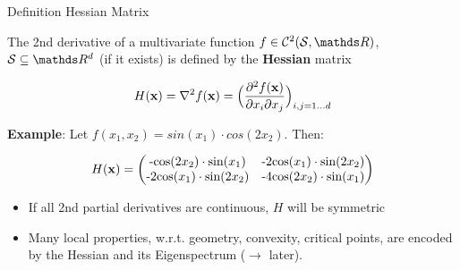 \documentclass[11pt,compress,t,notes=noshow, xcolor=table]{beamer}
\begin{document}
\begin{vbframe}{Definition Hessian Matrix}

The 2nd derivative of a multivariate function $f \in \mathcal{C}^2(\mathcal{S}, \R)$, $\mathcal{S}\subseteq \R^d$ (if it exists) is defined by the \textbf{Hessian} matrix

  \[ H(\mathbf{x}) =\nabla^2 f(\mathbf{x}) =
  \Bigl(\frac{\partial^2 f(\mathbf{x})}{\partial x_i \partial x_j}\Bigr)_{i,j=1\ldots d}\]
  
\lz 

\textbf{Example}: Let $f(x_1,x_2) = sin(x_1) \cdot cos(2x_2)$. Then:

$$
H(\mathbf{x}) = \begin{pmatrix}
\text{-cos}(2x_2)\cdot\text{sin}(x_1) & \text{-2cos}(x_1)\cdot\text{sin}(2x_2) 
\\ \text{-2cos}(x_1)\cdot\text{sin}(2x_2) & \text{-4cos}(2x_2)\cdot\text{sin}(x_1) 
\end{pmatrix}
$$

\begin{itemize}
    \item If all 2nd partial derivatives are continuous, $H$ will be symmetric
    \item Many local properties, w.r.t. geometry, convexity, critical points, 
    are encoded by the Hessian and its Eigenspectrum ($\rightarrow$ later).
\end{itemize}

\end{vbframe}
\end{document}
